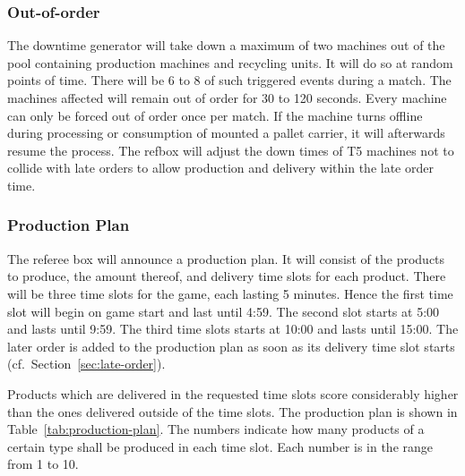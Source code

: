 \documentclass[12pt,twoside]{article}
\newcommand{\refsec}[1]{Section~\ref{#1}}
\begin{document}
\subsubsection{Out-of-order}
\label{sec:out-of-order}
The downtime generator will take down a maximum of two machines out of
the pool containing production machines and recycling units. It will
do so at random points of time. There will be 6 to 8 of such triggered
events during a match. The machines affected will remain out of order
for 30 to 120 seconds. Every machine can only be forced out of order
once per match. If the machine turns offline during processing or
consumption of mounted a pallet carrier, it will afterwards resume the
process.  The refbox will adjust the down times of T5 machines not to
collide with late orders to allow production and delivery within the
late order time.

\subsubsection{Production Plan}
The referee box will announce a production plan. It will consist of
the products to produce, the amount thereof, and delivery time slots
for each product. There will be three time slots for the game, each
lasting 5 minutes. Hence the first time slot will begin on game start
and last until 4:59. The second slot starts at 5:00 and lasts until
9:59. The third time slots starts at 10:00 and lasts until 15:00.  The
later order is added to the production plan as soon as its delivery
time slot starts (cf.~\refsec{sec:late-order}).

Products which are delivered in the requested time slots score
considerably higher than the ones delivered outside of the time
slots. The production plan is shown in
Table~\ref{tab:production-plan}. The numbers indicate how many
products of a certain type shall be produced in each time slot. Each
number is in the range from 1 to 10.
\end{document}

